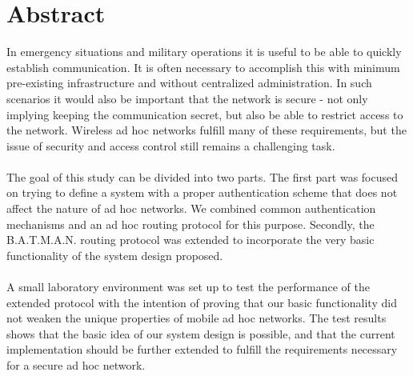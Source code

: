\chapter*{Abstract}

In emergency situations and military operations it is useful to be able to quickly establish communication. It is often necessary to accomplish this with minimum pre-existing infrastructure and without centralized administration. In such scenarios it would also be important that the network is secure - not only implying keeping the communication secret, but also be able to restrict access to the network. Wireless ad hoc networks fulfill many of these requirements, but the issue of security and access control still remains a challenging task.
\\\\
The goal of this study can be divided into two parts. The first part was focused on trying to define a system with a proper authentication scheme that does not affect the nature of ad hoc networks. We combined common authentication mechanisms and an ad hoc routing protocol for this purpose. Secondly, the B.A.T.M.A.N. routing protocol was extended to incorporate the very basic functionality of the system design proposed.
\\\\
A small laboratory environment was set up to test the performance of the extended protocol with the intention of proving that our basic functionality did not weaken the unique properties of mobile ad hoc networks. The test results shows that the basic idea of our system design is possible, and that the current implementation should be further extended to fulfill the requirements necessary for a secure ad hoc network.
